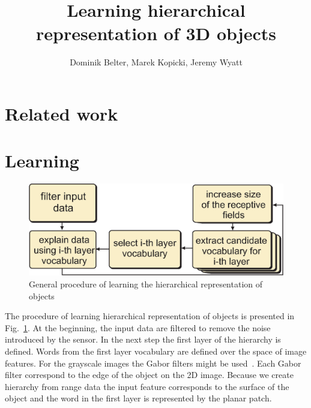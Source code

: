 \documentclass[letterpaper,10pt,conference]{ieeeconf}  %
\title{\LARGE \bf
 Learning hierarchical representation of 3D objects
}
\author{Dominik Belter, Marek Kopicki, Jeremy Wyatt%
}
\begin{document}
\maketitle
\thispagestyle{empty}
\pagestyle{empty}


\begin{abstract}
\end{abstract}



\section{Related work}

\section{Learning}


\begin{figure}[t]
 \centering
\includegraphics[width=0.9\columnwidth]{../images/learningGeneral.eps}
\caption{General procedure of learning the hierarchical representation of objects}
 \label{hopProc}
\end{figure}

The procedure of learning hierarchical representation of objects is presented in Fig.~\ref{hopProc}. At the beginning, the input data are filtered to remove the noise introduced by the sensor. In the next step the first layer of the hierarchy is defined. Words from the first layer vocabulary are defined over the space of image features. For the grayscale images the Gabor filters might be used~\cite{Fiedler2014}. Each Gabor filter correspond to the edge of the object on the 2D image. Because we create hierarchy from range data the input feature corresponds to the surface of the object and the word in the first layer is represented by the planar patch. 
\end{document}
